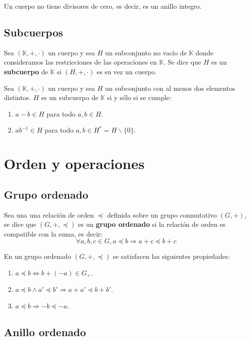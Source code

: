Un cuerpo no tiene divisores de cero, es decir, es un anillo integro.

\subsection{Subcuerpos}

Sea $(\mathbb{K},+,\cdot)$ un cuerpo y sea $H$ un subconjunto no vacío de $\mathbb{K}$ donde consideramos las restricciones de las operaciones en $\mathbb{K}$. Se dice que $H$ es un \textbf{subcuerpo} de $\mathbb{K}$ si $(H,+,\cdot)$ es su vez un cuerpo.

Sea $(\mathbb{K},+,\cdot)$ un cuerpo y sea $H$ un subconjunto con al menos dos elementos distintos. $H$ es un subcuerpo de $\mathbb{K}$ si y sólo si se cumple:
\begin{enumerate}
  \item $a-b \in H$ para todo $a,b \in H$.
  \item $ab^{-1} \in H$ para todo $a,b \in H^*=H\backslash \{0\}$.
\end{enumerate}

\section{Orden y operaciones}

\subsection{Grupo ordenado}

Sea una una relación de orden $\preceq$ definida sobre un grupo conmutativo $(G,+)$, se dice que $(G,+,\preceq)$ es un \textbf{grupo ordenado} si la relación de orden es compatible con la suma, es decir:
\[
\forall a,b,c \in G, a \preceq b \Rightarrow a+c \preceq b+c
\]

En un grupo ordenado $(G,+,\preceq)$ se satisfacen las siguientes propiedades:
\begin{enumerate}
  \item $a \preceq b \Leftrightarrow b+(-a) \in G_+$.
  \item $a \preceq b \wedge a' \preceq b' \Rightarrow a+a' \preceq b+b'$.
  \item $a \preceq b \Rightarrow -b \preceq -a$.
\end{enumerate}

\subsection{Anillo ordenado}

